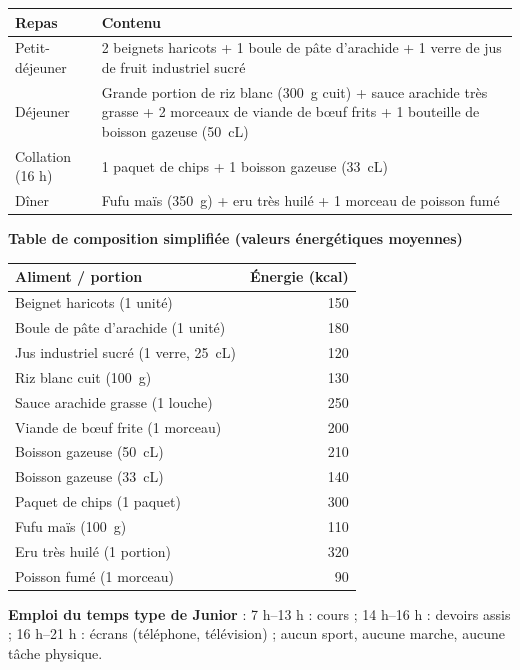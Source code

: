 \documentclass[11pt]{article}
\begin{document}
\begin{center}
\begin{tabularx}{\linewidth}{|l|X|}
\hline
\rowcolor{popblueL} \textbf{Repas} & \textbf{Contenu} \\
\hline
Petit-déjeuner & 2 beignets haricots + 1 boule de pâte d'arachide + 1 verre de jus de fruit industriel sucré \\
\hline
Déjeuner & Grande portion de riz blanc (\SI{300}{g} cuit) + sauce arachide très grasse + 2 morceaux de viande de bœuf frits + 1 bouteille de boisson gazeuse (\SI{50}{cL}) \\
\hline
Collation (16 h) & 1 paquet de chips + 1 boisson gazeuse (\SI{33}{cL}) \\
\hline
Dîner & Fufu maïs (\SI{350}{g}) + eru très huilé + 1 morceau de poisson fumé \\
\hline
\end{tabularx}
\end{center}

\textbf{Table de composition simplifiée (valeurs énergétiques moyennes)}

\begin{center}
\begin{tabularx}{\linewidth}{|X|r|}
\hline
\rowcolor{popblueL} \textbf{Aliment / portion} & \textbf{Énergie (kcal)} \\
\hline
Beignet haricots (1 unité) & 150 \\
\hline
Boule de pâte d'arachide (1 unité) & 180 \\
\hline
Jus industriel sucré (1 verre, \SI{25}{cL}) & 120 \\
\hline
Riz blanc cuit (\SI{100}{g}) & 130 \\
\hline
Sauce arachide grasse (1 louche) & 250 \\
\hline
Viande de bœuf frite (1 morceau) & 200 \\
\hline
Boisson gazeuse (\SI{50}{cL}) & 210 \\
\hline
Boisson gazeuse (\SI{33}{cL}) & 140 \\
\hline
Paquet de chips (1 paquet) & 300 \\
\hline
Fufu maïs (\SI{100}{g}) & 110 \\
\hline
Eru très huilé (1 portion) & 320 \\
\hline
Poisson fumé (1 morceau) & 90 \\
\hline
\end{tabularx}
\end{center}

\textbf{Emploi du temps type de Junior} : 7 h--13 h : cours ; 14 h--16 h : devoirs assis ; 16 h--21 h : écrans (téléphone, télévision) ; aucun sport, aucune marche, aucune tâche physique.
\end{document}
